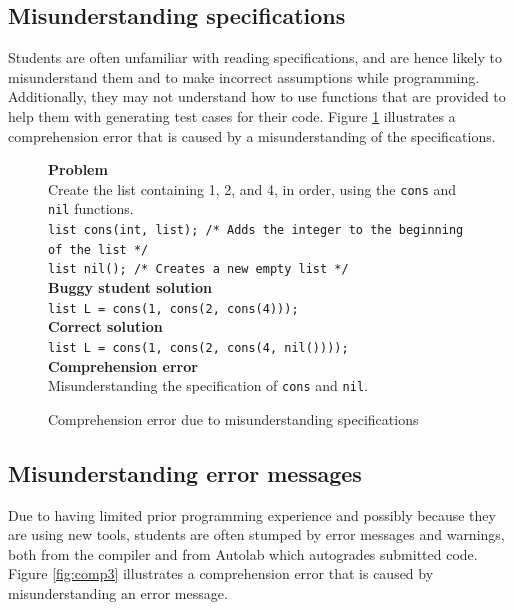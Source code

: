 \documentclass{sig-alternate}
\begin{document}
\subsection{Misunderstanding specifications}
\label{sec:comp2}
Students are often unfamiliar with reading specifications, and are hence likely to misunderstand them and to make incorrect assumptions while programming. Additionally, they may not understand how to use functions that are provided to help them with generating test cases for their code. Figure \ref{fig:comp2} illustrates a comprehension error that is caused by a misunderstanding of the specifications.\\

\begin{figure}
\begin{framed}
\setlength{\parindent}{0cm}
\textbf{Problem}\\
Create the list containing 1, 2, and 4, in order, using the \texttt{cons} and \texttt{nil} functions.\\

\texttt{list cons(int, list); /* Adds the integer to the beginning of the list */\\ list nil(); /* Creates a new empty list */}\\

\textbf{Buggy student solution}\\
\texttt{list L = cons(1, cons(2, cons(4)));}\\

\textbf{Correct solution}\\
\texttt{list L = cons(1, cons(2, cons(4, nil())));}\\

\textbf{Comprehension error}\\
Misunderstanding the specification of \texttt{cons} and \texttt{nil}.
\end{framed}
\caption{Comprehension error due to misunderstanding specifications}
\label{fig:comp2}
\end{figure}

\subsection{Misunderstanding error messages}
Due to having limited prior programming experience and possibly because they are using new tools, students are often stumped by error messages and warnings, both from the compiler and from Autolab which autogrades submitted code. Figure \ref{fig:comp3} illustrates a comprehension error that is caused by misunderstanding an error message.
\end{document}
